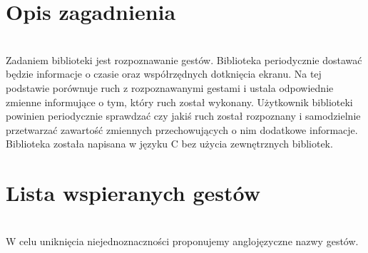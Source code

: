 \documentclass[a4paper,12pt]{article}
\begin{document}
\section{Opis zagadnienia} \ \\[0.1cm]
\indent Zadaniem biblioteki jest rozpoznawanie gestów. Biblioteka periodycznie dostawać będzie informacje o czasie oraz współrzędnych dotknięcia ekranu. Na tej podstawie porównuje ruch z rozpoznawanymi gestami i ustala odpowiednie zmienne informujące o tym, który ruch został wykonany. Użytkownik biblioteki powinien periodycznie sprawdzać czy jakiś ruch został rozpoznany i samodzielnie przetwarzać zawartość zmiennych przechowujących o nim dodatkowe informacje. Biblioteka została napisana w języku C bez użycia zewnętrznych bibliotek.



\section{Lista wspieranych gestów} \ \\[0.1cm]
\indent W celu uniknięcia niejednoznaczności proponujemy anglojęzyczne nazwy gestów.\\
\end{document}
